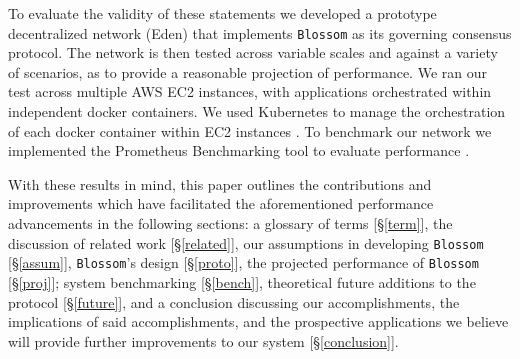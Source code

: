 To evaluate the validity of these statements we developed a prototype decentralized network  (Eden) that implements \texttt{Blossom} as its governing consensus protocol. The network is then tested across variable scales and against a variety of scenarios, as to provide a reasonable projection of performance. We ran our test across multiple AWS EC2 instances, with applications orchestrated within independent docker containers. We used Kubernetes to manage the orchestration of each docker container within EC2 instances \cite{burns2022kubernetes}. To benchmark our network we implemented the Prometheus Benchmarking tool to evaluate performance \cite{Prometheus_undated-lh}. 

With these results in mind, this paper outlines the contributions and improvements which have facilitated the aforementioned performance advancements in the following sections: a glossary of terms [\S\ref{term}], the discussion of related work [\S\ref{related}], our assumptions in developing \texttt{Blossom} [\S\ref{assum}], \texttt{Blossom}’s design [\S\ref{proto}], the projected performance of \texttt{Blossom}  [\S\ref{proj}]; system benchmarking [\S\ref{bench}], theoretical future additions to the protocol [\S\ref{future}], and a conclusion discussing our accomplishments, the implications of said accomplishments, and the prospective applications we believe will provide further improvements to our system [\S\ref{conclusion}].